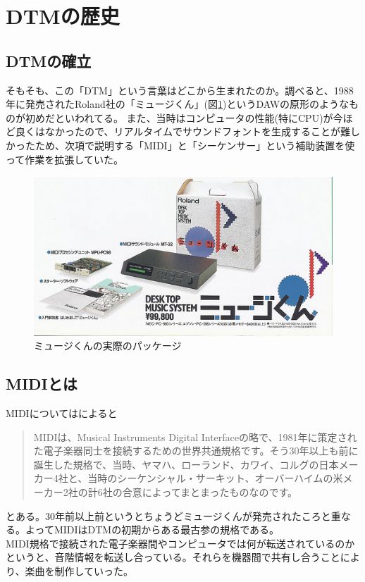\documentclass[ams]{U-AizuGT}
\begin{document}
\section{DTMの歴史}
\subsection{DTMの確立}
そもそも、この「DTM」という言葉はどこから生まれたのか。調べると、1988年に発売されたRoland社の「ミュージくん」(図\ref{fig:musikun})というDAWの原形のようなものが初めだといわれてる。\cite{melorepi}
また、当時はコンピュータの性能(特にCPU)が今ほど良くはなかったので、リアルタイムでサウンドフォントを生成することが難しかったため、次項で説明する「MIDI」と「シーケンサー」という補助装置を使って作業を拡張していた。\\
\begin{figure}[htbp]
  \begin{center}
    \includegraphics[scale=0.75]{./musikun.eps}
    \caption{ミュージくんの実際のパッケージ}
    \label{fig:musikun}
  \end{center}
\end{figure}

\subsection{MIDIとは}
MIDIについては\cite{dtmstation}によると
\begin{quotation}
  MIDIは、Musical Instruments Digital Interfaceの略で、1981年に策定された電子楽器同士を接続するための世界共通規格です。そう30年以上も前に誕生した規格で、当時、ヤマハ、ローランド、カワイ、コルグの日本メーカー4社と、当時のシーケンシャル・サーキット、オーバーハイムの米メーカー2社の計6社の合意によってまとまったものなのです。
\end{quotation}
とある。30年前以上前というとちょうどミュージくんが発売されたころと重なる。よってMIDIはDTMの初期からある最古参の規格である。\\
MIDI規格で接続された電子楽器間やコンピュータでは何が転送されているのかというと、音階情報を転送し合っている。それらを機器間で共有し合うことにより、楽曲を制作していった。\\
\end{document}
